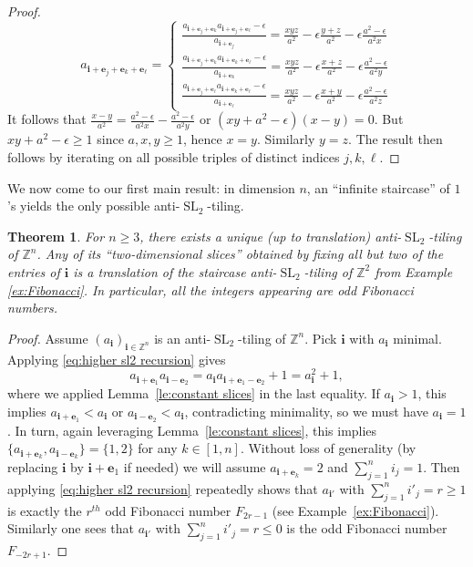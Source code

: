 \documentclass[12pt]{amsart}
\newtheorem{theorem}{Theorem}
\newcommand{\be}{\boldsymbol{e}}
\newcommand{\bi}{\boldsymbol{i}}
\newcommand{\SL}{\operatorname{SL}}
\newcommand{\ZZ}{\mathbb{Z}}
\begin{document}
\begin{proof}
\begin{equation*}
      a_{\bi+\be_j+\be_k+\be_\ell}=\left\{
        \begin{array}{l}
          \frac{a_{\bi+\be_j+\be_k}a_{\bi+\be_j+\be_\ell}-\epsilon}{a_{\bi+\be_j}}=\frac{xyz}{a^2}-\epsilon\frac{y+z}{a^2}-\epsilon\frac{a^2-\epsilon}{a^2x}\\
          \frac{a_{\bi+\be_j+\be_k}a_{\bi+\be_k+\be_\ell}-\epsilon}{a_{\bi+\be_k}}=\frac{xyz}{a^2}-\epsilon\frac{x+z}{a^2}-\epsilon\frac{a^2-\epsilon}{a^2y}\\
          \frac{a_{\bi+\be_j+\be_\ell}a_{\bi+\be_k+\be_\ell}-\epsilon}{a_{\bi+\be_\ell}}=\frac{xyz}{a^2}-\epsilon\frac{x+y}{a^2}-\epsilon\frac{a^2-\epsilon}{a^2z}
        \end{array}\right.
    \end{equation*}
    It follows that $\frac{x-y}{a^2}=\frac{a^2-\epsilon}{a^2x}-\frac{a^2-\epsilon}{a^2y}$ or $(xy+a^2-\epsilon)(x-y)=0$.
    But $xy+a^2-\epsilon\ge1$ since $a,x,y\ge1$, hence $x=y$.
    Similarly $y=z$.
    The result then follows by iterating on all possible triples of distinct indices $j,k,\ell$.
  \end{proof}

  We now come to our first main result: in dimension $n$, an ``infinite staircase'' of $1$'s yields the only possible anti-$\SL_2$-tiling.

  \begin{theorem}
    \label{thm:antitiling}
    For $n\ge3$, there exists a unique (up to translation) anti-$\SL_2$-tiling of $\ZZ^n$.
    Any of its ``two-dimensional slices'' obtained by fixing all but two of the entries of $\bi$ is a translation of the staircase anti-$\SL_2$-tiling of $\ZZ^2$ from Example \ref{ex:Fibonacci}.
    In particular, all the integers appearing are odd Fibonacci numbers.
  \end{theorem}
  \begin{proof}
    Assume $(a_{\bi})_{\bi\in\ZZ^n}$ is an anti-$\SL_2$-tiling of $\ZZ^n$.
    Pick $\bi$ with $a_{\bi}$ minimal.
    Applying \eqref{eq:higher sl2 recursion} gives
    \[
      a_{\bi+\be_1}a_{\bi-\be_2}=a_{\bi}a_{\bi+\be_1-\be_2}+1=a_{\bi}^2+1,
    \]
    where we applied Lemma~\ref{le:constant slices} in the last equality.
    If $a_{\bi}>1$, this implies $a_{\bi+\be_1}<a_{\bi}$ or $a_{\bi-\be_2}<a_{\bi}$, contradicting minimality, so we must have $a_{\bi}=1$.
    In turn, again leveraging Lemma~\ref{le:constant slices}, this implies $\{a_{\bi+\be_k},a_{\bi-\be_k}\}=\{1,2\}$ for any $k\in[1,n]$.
    Without loss of generality (by replacing $\bi$ by $\bi+\be_1$ if needed) we will assume $a_{\bi+\be_k}=2$ and $\sum_{j=1}^n i_j=1$.
    Then applying \eqref{eq:higher sl2 recursion} repeatedly shows that $a_{\bi'}$ with $\sum_{j=1}^n i'_j=r\ge1$ is exactly the $r^{th}$ odd Fibonacci number $F_{2r-1}$ (see Example~\ref{ex:Fibonacci}).
    Similarly one sees that $a_{\bi'}$ with $\sum_{j=1}^n i'_j =r\le0$ is the odd Fibonacci number $F_{-2r+1}$.
  \end{proof}
\end{document}
